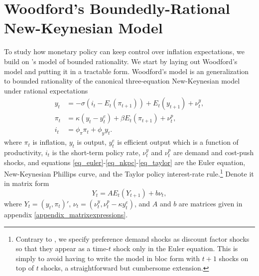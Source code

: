 \documentclass{article}
\begin{document}
\section{Woodford's Boundedly-Rational New-Keynesian Model}\label{sec_model}
To study how monetary policy can keep control over inflation expectations, we build on \cite{Woodford2019}'s model of bounded rationality. We start by laying out Woodford's model and putting it in a tractable form. Woodford's model is an generalization to bounded rationality of the canonical three-equation New-Keynesian model under rational expectations 
\begin{align}
y_t &= -\sigma (i_t - E_t(\pi_{t+1})) + E_t(y_{t+1}) + \nu_t^y,\label{eq_euler}\\
\pi_t &= \kappa (y_t-y_t^e) + \beta E_t(\pi_{t+1}) + \nu_t^p,\label{eq_nkpc}\\
i_t &= \phi_{\pi} \pi_t + \phi_y y_t.\label{eq_taylor}
\end{align}
where $\pi_t$ is inflation, $y_t$ is output, $y_t^e$ is efficient output which is a function of productivity, $i_t$ is the short-term policy rate, $\nu_t^y$ and $\nu_t^p$ are demand and cost-push shocks, and equations \eqref{eq_euler}-\eqref{eq_nkpc}-\eqref{eq_taylor} are the Euler equation, New-Keynesian Phillips curve, and the Taylor policy interest-rate rule.\footnote{Contrary to \cite{Woodford2019}, we specify preference demand shocks as discount factor shocks so that they appear as a time-$t$ shock only in the Euler equation. This is simply to avoid having to write the model in bloc form with $t+1$ shocks on top of $t$ shocks, a straightforward but cumbersome extension.}
Denote it in matrix form
\begin{equation}
Y_t = A E_t(Y_{t+1}) +  b \nu_t,\label{eq_system_re}
\end{equation}
where $Y_t = (y_t,\pi_t)'$, $\nu_t = (\nu_t^y,\nu_t^p-\kappa y_t^e)$, and $A$ and $b$ are matrices given in appendix \ref{appendix_matrixexpressions}.
\end{document}
